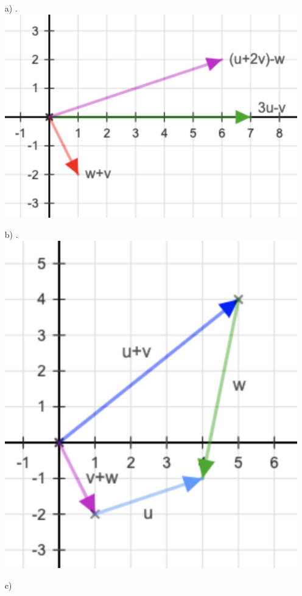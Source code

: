 \documentclass{article}
\begin{document}
\begin{enumerate}
	\item[a)]
	      .\\
	      \includegraphics[scale=0.4]{uppg1_1_a}
	\item[b)]
	      .\\
	      \includegraphics[scale=0.4]{uppg1_1_b}
	\item[c)]

\end{enumerate}
\end{document}
